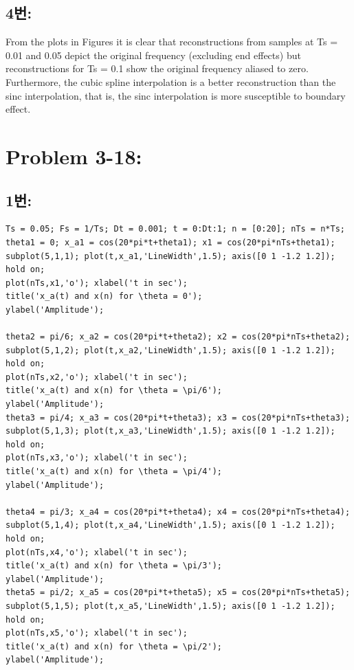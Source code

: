 \documentclass[11pt
  , a4paper
  , article
  , oneside
]{memoir}
\begin{document}
\clearpage

\section{4번: }
From the plots in Figures it is clear that reconstructions from samples at Ts = 0.01 and 0.05 depict the original frequency (excluding end effects) but reconstructions for Ts = 0.1 show the original frequency aliased to zero. Furthermore, the cubic spline interpolation is a better reconstruction than the sinc interpolation, that is, the sinc interpolation is more susceptible to boundary effect.


\chapter{Problem 3-18:}
\section{1번: }
\begin{lstlisting}[style=termstyle]
%Problem 3.18-1
Ts = 0.05; Fs = 1/Ts; Dt = 0.001; t = 0:Dt:1; n = [0:20]; nTs = n*Ts;
theta1 = 0; x_a1 = cos(20*pi*t+theta1); x1 = cos(20*pi*nTs+theta1);
subplot(5,1,1); plot(t,x_a1,'LineWidth',1.5); axis([0 1 -1.2 1.2]); hold on;
plot(nTs,x1,'o'); xlabel('t in sec');
title('x_a(t) and x(n) for \theta = 0');
ylabel('Amplitude');

theta2 = pi/6; x_a2 = cos(20*pi*t+theta2); x2 = cos(20*pi*nTs+theta2);
subplot(5,1,2); plot(t,x_a2,'LineWidth',1.5); axis([0 1 -1.2 1.2]); hold on;
plot(nTs,x2,'o'); xlabel('t in sec');
title('x_a(t) and x(n) for \theta = \pi/6');
ylabel('Amplitude');
theta3 = pi/4; x_a3 = cos(20*pi*t+theta3); x3 = cos(20*pi*nTs+theta3);
subplot(5,1,3); plot(t,x_a3,'LineWidth',1.5); axis([0 1 -1.2 1.2]); hold on;
plot(nTs,x3,'o'); xlabel('t in sec');
title('x_a(t) and x(n) for \theta = \pi/4');
ylabel('Amplitude');

theta4 = pi/3; x_a4 = cos(20*pi*t+theta4); x4 = cos(20*pi*nTs+theta4);
subplot(5,1,4); plot(t,x_a4,'LineWidth',1.5); axis([0 1 -1.2 1.2]); hold on;
plot(nTs,x4,'o'); xlabel('t in sec');
title('x_a(t) and x(n) for \theta = \pi/3');
ylabel('Amplitude');
theta5 = pi/2; x_a5 = cos(20*pi*t+theta5); x5 = cos(20*pi*nTs+theta5);
subplot(5,1,5); plot(t,x_a5,'LineWidth',1.5); axis([0 1 -1.2 1.2]); hold on;
plot(nTs,x5,'o'); xlabel('t in sec');
title('x_a(t) and x(n) for \theta = \pi/2');
ylabel('Amplitude');
\end{lstlisting}
\end{document}
